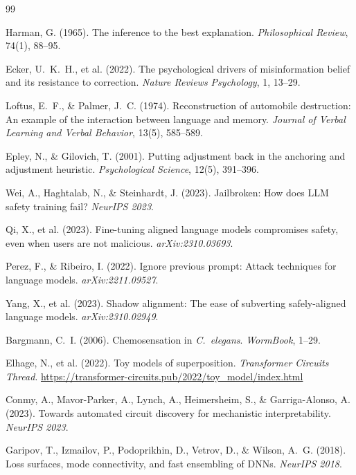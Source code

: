 \documentclass[12pt]{article}
\begin{document}
\begin{thebibliography}{99}

Harman, G. (1965).
The inference to the best explanation.
\textit{Philosophical Review}, 74(1), 88--95.

Ecker, U.~K.~H., et al. (2022).
The psychological drivers of misinformation belief and its resistance
to correction.
\textit{Nature Reviews Psychology}, 1, 13--29.

Loftus, E.~F., \& Palmer, J.~C. (1974).
Reconstruction of automobile destruction: An example of the
interaction between language and memory.
\textit{Journal of Verbal Learning and Verbal Behavior}, 13(5),
585--589.

Epley, N., \& Gilovich, T. (2001).
Putting adjustment back in the anchoring and adjustment heuristic.
\textit{Psychological Science}, 12(5), 391--396.

Wei, A., Haghtalab, N., \& Steinhardt, J. (2023).
Jailbroken: How does LLM safety training fail?
\textit{NeurIPS 2023}.

Qi, X., et al. (2023).
Fine-tuning aligned language models compromises safety,
even when users are not malicious.
\textit{arXiv:2310.03693}.

Perez, F., \& Ribeiro, I. (2022).
Ignore previous prompt: Attack techniques for language models.
\textit{arXiv:2211.09527}.

Yang, X., et al. (2023).
Shadow alignment: The ease of subverting safely-aligned language
models.
\textit{arXiv:2310.02949}.

Bargmann, C.~I. (2006).
Chemosensation in \textit{C.~elegans}.
\textit{WormBook}, 1--29.

Elhage, N., et al. (2022).
Toy models of superposition.
\textit{Transformer Circuits Thread}.
\url{https://transformer-circuits.pub/2022/toy_model/index.html}

Conmy, A., Mavor-Parker, A., Lynch, A., Heimersheim, S.,
\& Garriga-Alonso, A. (2023).
Towards automated circuit discovery for mechanistic interpretability.
\textit{NeurIPS 2023}.

Garipov, T., Izmailov, P., Podoprikhin, D., Vetrov, D.,
\& Wilson, A.~G. (2018).
Loss surfaces, mode connectivity, and fast ensembling of DNNs.
\textit{NeurIPS 2018}.


\end{thebibliography}
\end{document}
